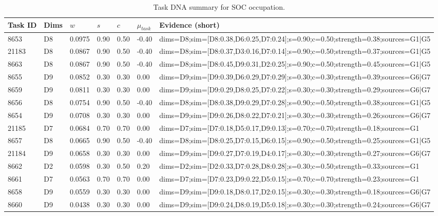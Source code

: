 \begin{table}[htbp]
\centering
\caption{Task DNA summary for SOC occupation.}
\label{tab:appendix_taskdna}
\begin{tabular}{@{}lllllll@{}}
\toprule
Task ID & Dims & $w$ & $s$ & $c$ & $\mu_{task}$ & Evidence (short) \\
\midrule
8653 & D8 & 0.0975 & 0.90 & 0.50 & -0.40 & dims=D8;sim=[D8:0.38,D6:0.25,D7:0.24];s=0.90;c=0.50;strength=0.38;sources=G1|G5 \\
21183 & D8 & 0.0867 & 0.90 & 0.50 & -0.40 & dims=D8;sim=[D8:0.37,D3:0.16,D7:0.14];s=0.90;c=0.50;strength=0.37;sources=G1|G5 \\
8663 & D8 & 0.0867 & 0.90 & 0.50 & -0.40 & dims=D8;sim=[D8:0.45,D9:0.31,D2:0.25];s=0.90;c=0.50;strength=0.45;sources=G1|G5 \\
8655 & D9 & 0.0852 & 0.30 & 0.30 & 0.00 & dims=D9;sim=[D9:0.39,D6:0.29,D7:0.29];s=0.30;c=0.30;strength=0.39;sources=G6|G7 \\
8659 & D9 & 0.0811 & 0.30 & 0.30 & 0.00 & dims=D9;sim=[D9:0.29,D8:0.25,D7:0.22];s=0.30;c=0.30;strength=0.29;sources=G6|G7 \\
8656 & D8 & 0.0754 & 0.90 & 0.50 & -0.40 & dims=D8;sim=[D8:0.38,D9:0.29,D7:0.28];s=0.90;c=0.50;strength=0.38;sources=G1|G5 \\
8654 & D9 & 0.0708 & 0.30 & 0.30 & 0.00 & dims=D9;sim=[D9:0.26,D8:0.22,D7:0.21];s=0.30;c=0.30;strength=0.26;sources=G6|G7 \\
21185 & D7 & 0.0684 & 0.70 & 0.70 & 0.00 & dims=D7;sim=[D7:0.18,D5:0.17,D9:0.13];s=0.70;c=0.70;strength=0.18;sources=G1 \\
8657 & D8 & 0.0665 & 0.90 & 0.50 & -0.40 & dims=D8;sim=[D8:0.25,D7:0.15,D6:0.15];s=0.90;c=0.50;strength=0.25;sources=G1|G5 \\
21184 & D9 & 0.0658 & 0.30 & 0.30 & 0.00 & dims=D9;sim=[D9:0.27,D7:0.19,D4:0.17];s=0.30;c=0.30;strength=0.27;sources=G6|G7 \\
8662 & D2 & 0.0598 & 0.30 & 0.50 & 0.20 & dims=D2;sim=[D2:0.33,D7:0.28,D8:0.28];s=0.30;c=0.50;strength=0.33;sources=G1 \\
8661 & D7 & 0.0563 & 0.70 & 0.70 & 0.00 & dims=D7;sim=[D7:0.23,D9:0.22,D5:0.15];s=0.70;c=0.70;strength=0.23;sources=G1 \\
8658 & D9 & 0.0559 & 0.30 & 0.30 & 0.00 & dims=D9;sim=[D9:0.18,D8:0.17,D2:0.15];s=0.30;c=0.30;strength=0.18;sources=G6|G7 \\
8660 & D9 & 0.0438 & 0.30 & 0.30 & 0.00 & dims=D9;sim=[D9:0.24,D8:0.19,D5:0.18];s=0.30;c=0.30;strength=0.24;sources=G6|G7 \\
\bottomrule
\end{tabular}
\end{table}
